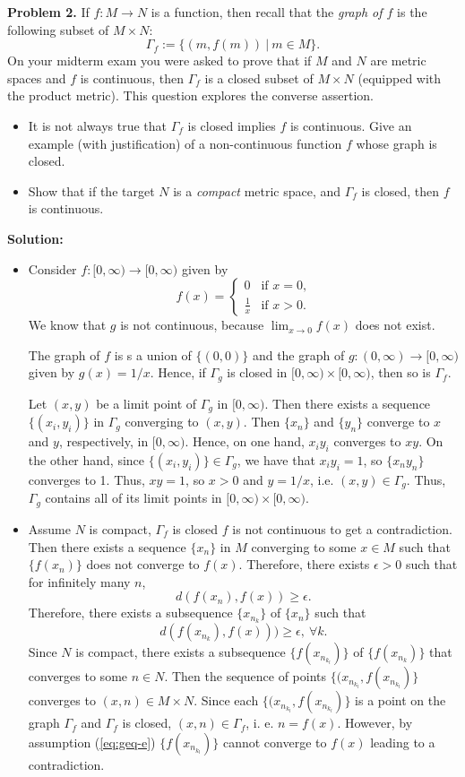 \documentclass[12pt]{article}
\def\black{\color{black}}
\def\green{\color{rltgreen}}
\newcommand\bi{\begin{itemize}}
\newcommand\ei{\end{itemize}}
\newcommand\beq{\begin{equation}}
\newcommand\eeq{\end{equation}}
\newcommand\itema{\item[(a)]}
\newcommand\itemb{\item[(b)]}
\renewcommand\|{\ | \ }
\newcommand\ra{\rightarrow}
\def\manylinedefinition#1{
\left\{\begin{array}{ll}
#1
\end{array}\right.
}
\def\pb#1{{\green \bf Problem #1.}\hskip 8pt \black}
\def\sol{\textbf{Solution:}}
\def\sequence#1{$\{{#1}_n\}$}
\def\subsequence#1{$\{{#1}_{n_k}\}$}
\begin{document}
\pb{2}
If $f: M \ra N$ is a function, then recall that the \emph{graph of $f$} is
the following subset of $M \times N$:
\[
\Gamma_f := \{(m, f(m)) \| m \in M\}.
\]
On your midterm exam you were asked to prove that if $M$ and $N$ are metric
spaces and $f$ is continuous, then $\Gamma_f$ is a closed subset of 
$M \times N$ (equipped with the product metric). This question explores the 
converse assertion.

\bi
\itema
It is not always true that $\Gamma_f$ is closed implies $f$ is continuous.
Give an example (with justification) of a non-continuous function $f$ whose
graph is closed.
\itemb
Show that if the target $N$ is a \emph{compact} metric space, and 
$\Gamma_f$ is closed, then $f$ is continuous.
\ei

\sol

\bi
\itema
Consider $f:[0, \infty) \ra [0, \infty)$ given by
\[
f(x) = \manylinedefinition{
	0 & \text{if $x = 0$,} \\
    \frac 1 x & \text{if $x > 0$.}
}
\]
We know that $g$ is not continuous, because $\lim_{x \ra 0} f(x)$
does not exist.

The graph of $f$ is s a union of $\{(0, 0)\}$ and the graph of
$g: (0, \infty) \ra [0, \infty)$ given by $g(x) = 1/x$. Hence, 
if $\Gamma_g$ is closed in $[0, \infty) \times [0, \infty)$, then so is
$\Gamma_f$.

Let $(x, y)$ be a limit point of $\Gamma_g$ in $[0, \infty)$. Then there
exists a sequence $\{(x_i, y_i)\}$ in $\Gamma_g$ converging to $(x, y)$.
Then \sequence x and \sequence y converge to $x$ and $y$, respectively,
in $[0, \infty)$. Hence, on one hand, $x_iy_i$ converges to $xy$. 
On the other hand, since $\{(x_i, y_i)\} \in \Gamma_g$, we have that 
$x_iy_i = 1$, so $\{x_ny_n\}$ converges to 1. Thus, $xy = 1$, so $x > 0$ 
and $y = 1/x$, i.e. $(x, y) \in \Gamma_g$. Thus, $\Gamma_g$ contains all
of its limit points in $[0, \infty) \times [0, \infty)$.

\itemb
Assume $N$ is compact, $\Gamma_f$ is closed $f$ is not continuous to get a 
contradiction.
Then there exists a sequence \sequence x in $M$ converging to some $x \in M$
such that $\{f(x_n)\}$ does not converge to $f(x)$. Therefore, there
exists $\epsilon > 0$ such that for infinitely many $n$, 
\[d(f(x_n), f(x)) \geq \epsilon.
\]
Therefore, there exists a subsequence
\subsequence x of \sequence x such that 
\beq
\label{eq:geq-e}
d(f(x_{n_k}), f(x))) \geq \epsilon, \> \forall k.
\eeq
Since $N$ is compact, there exists a subsequence 
$\{f(x_{n_{k_l}})\}$ of $\{f(x_{n_k})\}$ that converges to some $n \in N$. 
Then the sequence of points $\{(x_{n_{k_l}}, f(x_{n_{k_l}})\}$ converges
to $(x, n) \in M \times N$. Since each $\{(x_{n_{k_l}}, f(x_{n_{k_l}})\}$
is a point on the graph $\Gamma_f$ and $\Gamma_f$ is closed,
$(x, n) \in \Gamma_f$, i. e. $n = f(x)$. 
However, by assumption (\ref{eq:geq-e}) $\{f(x_{n_{k_l}})\}$ cannot
converge to $f(x)$ leading to a contradiction.
\ei
\end{document}
